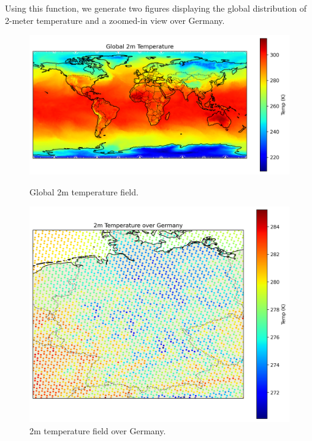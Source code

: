Using this function, we generate two figures displaying the global distribution of 2-meter temperature and a zoomed-in view over Germany.

\begin{figure}[ht]
    \centering
    \begin{minipage}{0.5\textwidth}
        \centering
        \includegraphics[width=\textwidth]{images/icon_t2m_global.png}
        \caption{Global 2m temperature field.}
        \label{fig:t2m_global_interp}
    \end{minipage}
    \hfill
    \begin{minipage}{0.4\textwidth}
        \centering
        \includegraphics[width=\textwidth]{images/icon_t2m_germany.png}
        \caption{2m temperature field over Germany.}
        \label{fig:t2m_germany_interp}
    \end{minipage}
\end{figure}

